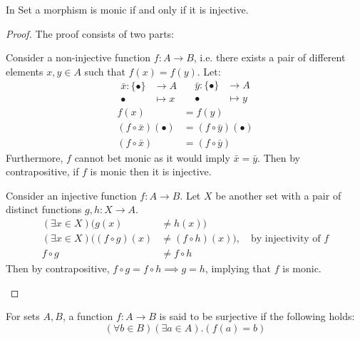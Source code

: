\begin{theorem}\label{thm:mono_iff_inj}
  In Set a morphism is monic if and only if it is injective.

  \begin{proof}
    The proof consists of two parts:
    \begin{description}
      \item[$(\implies)$] Consider a non-injective function $f:A\to B$, i.e.
        there exists a pair of different elements $x,y\in A$ such that
        $f(x)=f(y)$. Let:
        \[
          \begin{aligned}
            \bar{x} : \{\bullet\} &\to A\\
            \bullet &\mapsto x
          \end{aligned}
          \quad
          \begin{aligned}
            \bar{y} : \{\bullet\} &\to A\\
            \bullet &\mapsto y
          \end{aligned}
        \]
        \[
          \begin{aligned}
            f(x) &= f(y)\\
            (f\circ\bar{x})(\bullet) &= (f\circ\bar{y})(\bullet)\\
            (f\circ\bar{x}) &= (f\circ\bar{y})
          \end{aligned}
        \]
        Furthermore, $f$ cannot bet monic as it would imply $\bar{x} = \bar{y}$.
        Then by contrapositive, if $f$ is monic then it is injective.
      \item Consider an injective function $f:A\to B$. Let $X$ be another set
        with a pair of distinct functions $g, h:X\to A$.
        \[
          \begin{aligned}
            (\exists x\in X)(g(x) &\neq h(x))\\
            (\exists x\in X)((f\circ g)(x) &\neq (f\circ h)(x))
            ,\quad\text{by injectivity of $f$}\\
            f\circ g &\neq f\circ h
          \end{aligned}
        \]
        Then by contrapositive, $f\circ g = f\circ h \implies g = h$, implying
        that $f$ is monic.
    \end{description}
  \end{proof}
\end{theorem}

\begin{definition}
  For sets $A,B$, a function $f:A\to B$ is said to be surjective if the
  following holds:
  \[(\forall b\in B)(\exists a\in A).(f(a)=b)\]
\end{definition}

